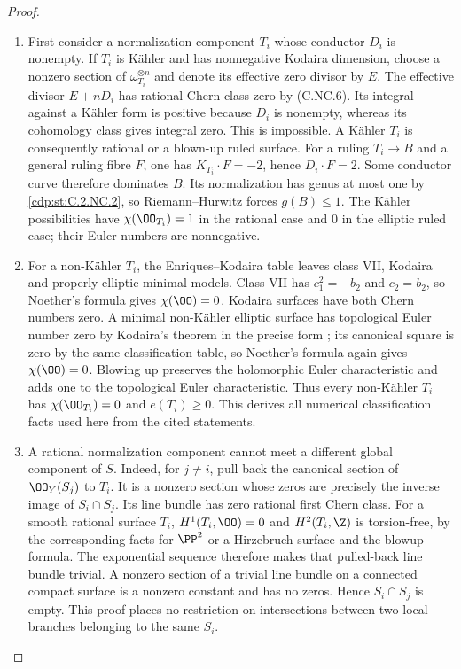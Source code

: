 \begin{proof}

\begin{enumerate}[label={$\langle1\rangle$\arabic*.},leftmargin=*]
\item First consider a normalization component $T_i$ whose conductor $D_i$ is nonempty. If $T_i$ is Kähler and has nonnegative Kodaira dimension, choose a nonzero section of $\omega_{T_i}^{\otimes n}$ and denote its effective zero divisor by $E$. The effective divisor $E+nD_i$ has rational Chern class zero by (C.NC.6). Its integral against a Kähler form is positive because $D_i$ is nonempty, whereas its cohomology class gives integral zero. This is impossible. A Kähler $T_i$ is consequently rational or a blown-up ruled surface. For a ruling $T_i\to B$ and a general ruling fibre $F$, one has $K_{T_i}\cdot F=-2$, hence $D_i\cdot F=2$. Some conductor curve therefore dominates $B$. Its normalization has genus at most one by \ref{cdp:st:C.2.NC.2}, so Riemann--Hurwitz forces $g(B)\le1$. The Kähler possibilities have
$\chi(\OO_{T_i})=1$ in the rational case and $0$ in the elliptic ruled case; their Euler numbers are nonnegative.

\item For a non-Kähler $T_i$, the Enriques--Kodaira table \cite[Theorem~2.2]{Peters2021} leaves class VII, Kodaira and properly elliptic minimal models. Class VII has $c_1^2=-b_2$ and $c_2=b_2$, so Noether's formula gives $\chi(\OO)=0$. Kodaira surfaces have both Chern numbers zero. A minimal non-Kähler elliptic surface has topological Euler number zero by Kodaira's theorem in the precise form \cite[Theorem~3.2]{BMS2012}; its canonical square is zero by the same classification table, so Noether's formula again gives $\chi(\OO)=0$. Blowing up preserves the holomorphic Euler characteristic and adds one to the topological Euler characteristic. Thus every non-Kähler $T_i$ has $\chi(\OO_{T_i})=0$ and $e(T_i)\ge0$. This derives all numerical classification facts used here from the cited statements.

\item A rational normalization component cannot meet a different global component of $S$. Indeed, for $j\ne i$, pull back the canonical section of $\OO_Y(S_j)$ to $T_i$. It is a nonzero section whose zeros are precisely the inverse image of $S_i\cap S_j$. Its line bundle has zero rational first Chern class. For a smooth rational surface $T_i$, $H^1(T_i,\OO)=0$ and $H^2(T_i,\Z)$ is torsion-free, by the corresponding facts for $\PP^2$ or a Hirzebruch surface and the blowup formula. The exponential sequence therefore makes that pulled-back line bundle trivial. A nonzero section of a trivial line bundle on a connected compact surface is a nonzero constant and has no zeros. Hence $S_i\cap S_j$ is empty. This proof places no restriction on intersections between two local branches belonging to the same $S_i$.


\end{enumerate}
\end{proof}
